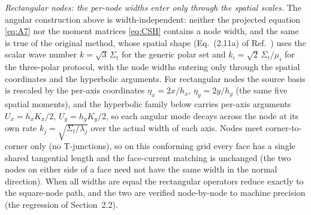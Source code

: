 \documentclass[11pt,a4paper]{article}
\begin{document}
\emph{Rectangular nodes: the per-node widths enter only through the
spatial scales.}
The angular construction above is width-independent: neither the
projected equation \eqref{eq:A7} nor the moment matrices
\eqref{eq:CSH} contains a node width, and the same is true of the
original method, whose spatial shape (Eq.~(2.11a) of
Ref.~\cite{psn2027}) uses the scalar wave number
$k=\sqrt{3}\,\Sigma_t$ for the generic polar set and
$k_i=\sqrt{2}\,\Sigma_t/\mu_i$ for the three-polar protocol, with the
node widths entering only through the spatial coordinates and the
hyperbolic arguments. For rectangular nodes the source basis is
rescaled by the per-axis coordinates $\eta_x=2x/h_x$,
$\eta_y=2y/h_y$ (the same five spatial moments), and the hyperbolic
family below carries per-axis arguments $U_x=h_xK_x/2$,
$U_y=h_yK_y/2$, so each angular mode decays across the node at its own
rate $k_j=\sqrt{\Sigma_t/\lambda_j}$ over the actual width of each
axis. Nodes meet corner-to-corner only (no T-junctions), so on this
conforming grid every face has a single shared tangential length and
the face-current matching is unchanged (the two nodes on either side
of a face need not have the same width in the normal direction). When all widths are equal the rectangular
operators reduce exactly to the square-node path, and the two are
verified node-by-node to machine precision (the regression of
Section~2.2).
\end{document}
